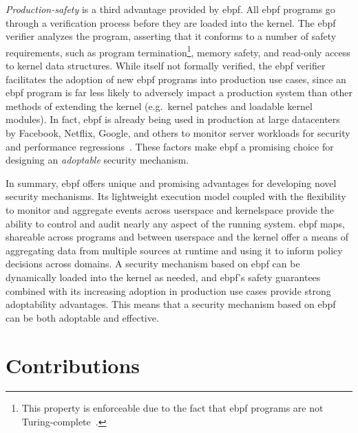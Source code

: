 \textit{Production-safety} is a third advantage provided by \gls{ebpf}. All \gls{ebpf} programs go
through a verification process before they are loaded into the kernel. The \gls{ebpf} verifier
analyzes the program, asserting that it conforms to a number of safety requirements, such
as program termination\footnote{This property is enforceable due to the fact that \gls{ebpf}
programs are not Turing-complete~\cite{gregg2019_bpf}.}, memory safety, and read-only
access to kernel data structures. While itself not formally verified, the \gls{ebpf} verifier
facilitates the adoption of new \gls{ebpf} programs into production use cases, since an \gls{ebpf}
program is far less likely to adversely impact a production system than other methods of
extending the kernel (e.g.\ kernel patches and loadable kernel modules). In fact, \gls{ebpf} is
already being used in production at large datacenters by Facebook, Netflix, Google, and
others to monitor server workloads for security and performance
regressions~\cite{gregg2019_bpf}. These factors make \gls{ebpf} a promising choice for
designing an \textit{adoptable} security mechanism.

In summary, \gls{ebpf} offers unique and promising advantages for developing novel security
mechanisms. Its lightweight execution model coupled with the flexibility to monitor and
aggregate events across userspace and kernelspace provide the ability to control and audit
nearly any aspect of the running system. \gls{ebpf} maps, shareable across programs and between
userspace and the kernel offer a means of aggregating data from multiple sources at
runtime and using it to inform policy decisions across domains. A security mechanism based
on \gls{ebpf} can be dynamically loaded into the kernel as needed, and \gls{ebpf}'s safety guarantees
combined with its increasing adoption in production use cases provide strong adoptability
advantages. This means that a security mechanism based on \gls{ebpf} can be both adoptable and
effective.


\section{Contributions}%
\label{s:contributions}

